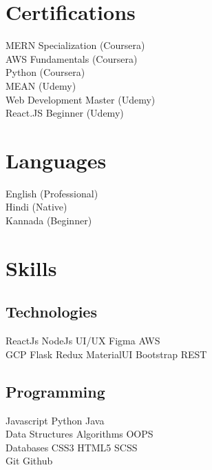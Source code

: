 \documentclass[]{deedy-resume-openfont}
\begin{document}
\begin{minipage}[t]{0.33\textwidth}

\section{Certifications}
MERN Specialization (Coursera) \\
AWS Fundamentals (Coursera) \\
Python (Coursera) \\
MEAN (Udemy) \\
Web Development Master (Udemy) \\
React.JS Beginner  (Udemy) \\
\sectionsep
\section{Languages}
English (Professional) \\
Hindi (Native) \\
Kannada (Beginner) \\
\sectionsep

\section{Skills}
\subsection{Technologies}
\textbullet{}ReactJs  \textbullet{} NodeJs \textbullet{}UI/UX \textbullet{}Figma \textbullet{} AWS \\ \textbullet{} GCP Flask \textbullet{} Redux \textbullet{} MaterialUI \textbullet{}Bootstrap \textbullet{}  REST \\
\sectionsep

\subsection{Programming}
Javascript  \textbullet{} Python \textbullet{} Java \\
Data Structures \textbullet{}   Algorithms \textbullet{} OOPS \\
Databases \textbullet{} CSS3 \textbullet{} HTML5 \textbullet{} SCSS \\
Git \textbullet{} Github

%
%

\end{minipage} 
\end{document}
